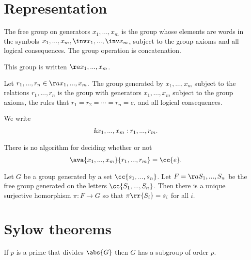 \documentclass{article}
\begin{document}
\section{Representation}
\label{sec:representation}

\begin{definition}
  \label{def:free-group}
  The free group on generators $x_1,...,x_m$ is the group whose elements are words in the
  symbols $x_1,...,x_m,\inv x_1, ...,\inv x_m$, subject to the group axioms and all logical
  consequences. The group operation is concatenation.

  This group is written $\aa{x_1,...,x_m}$.
\end{definition}

\begin{definition}
  Let $r_1,...,r_n\in\aa{x_1,...,x_m}$. The group generated by $x_1,...,x_m$ subject
  to the relations $r_1,...,r_n$ is the group with generators $x_1,...,x_m$ subject to the
  group axioms, the rules that $r_1=r_2=\cdots=r_n=e$, and all logical consequences.

  We write
  \begin{align*}
    \aa{x_1,...,x_m : r_1,...,r_m}.
  \end{align*}
\end{definition}

\begin{theorem}[Novikov]
  There is no algorithm for deciding whether or not
  \begin{align*}
    \ava{x_1,...,x_m}{r_1,...,r_m}=\cc{e}.
  \end{align*}
\end{theorem}

\begin{proposition}
  Let $G$ be a group generated by a set $\cc{s_1,...,s_n}$. Let $F=\aa{S_1,...,S_n}$
  be the free group generated on the letters $\cc{S_1,...,S_n}$. Then there is a unique
  surjective homorphism $\pi:F\to G$ so that $\pi\rr{S_i}=s_i$ for all $i$.
\end{proposition}

\section{Sylow theorems}
\label{sec:sylow-theorems}

\begin{theorem}[Cauchy]
  If $p$ is a prime that divides $\abs{G}$ then $G$ has a subgroup of order $p$.
\end{theorem}
\end{document}
